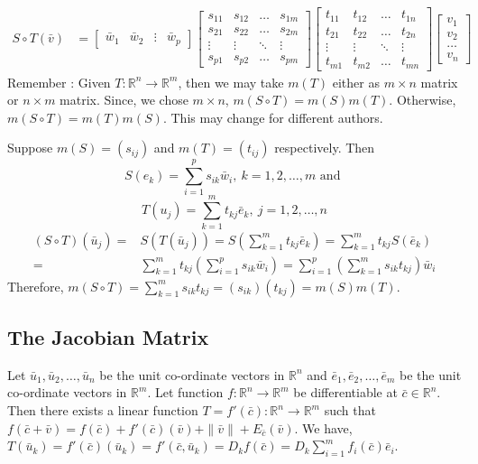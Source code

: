 \begin{commentary}
\begin{align*}
	S \circ T(\bar{v}) & = \begin{bmatrix} \bar{w}_1 & \bar{w}_2 & \vdots & \bar{w}_p \end{bmatrix} \begin{bmatrix} s_{11} & s_{12} & \dots & s_{1m} \\ s_{21} & s_{22} & \dots & s_{2m} \\ \vdots & \vdots & \ddots & \vdots \\ s_{p1} & s_{p2} & \dots & s_{pm} \end{bmatrix} \begin{bmatrix} t_{11} & t_{12} & \dots & t_{1n} \\ t_{21} & t_{22} & \dots & t_{2n} \\ \vdots & \vdots & \ddots & \vdots \\ t_{m1} & t_{m2} & \dots & t_{mn} \end{bmatrix} \begin{bmatrix} v_1 \\ v_2 \\ \dots \\ v_n  \end{bmatrix} 
\end{align*}
Remember : Given $T : \mathbb{R}^n \to \mathbb{R}^m$, then we may take $m(T)$ either as $m \times n$ matrix or $n \times m$ matrix.
Since, we chose $m \times n$, $m(S \circ T) = m(S)m(T)$.
Otherwise, $m(S \circ T) = m(T)m(S)$.
This may change for different authors.
\end{commentary}

Suppose $m(S) = (s_{ij})$ and $m(T) = (t_{ij})$ respectively.
Then
\[ S(e_k) = \sum_{i=1}^p s_{ik} \bar{w}_i,\ k=1,2,\dots,m \text{ and }\]
\[ T(u_j) = \sum_{k=1}^m t_{kj} \bar{e}_k,\ j=1,2,\dots,n \]
\begin{align*}
	(S \circ T)(\bar{u}_j) = & S(T(\bar{u}_j)) = S\left(\sum_{k=1}^m t_{kj}\bar{e}_k\right) = \sum_{k=1}^m t_{kj}S(\bar{e}_k) \\ 
	= & \sum_{k=1}^m t_{kj}\left( \sum_{i=1}^p s_{ik} \bar{w}_i\right) = \sum_{i=1}^p \left(\sum_{k=1}^m s_{ik}t_{kj}\right)\bar{w}_i
\end{align*}
Therefore, $m(S \circ T) = \sum_{k=1}^m s_{ik}t_{kj} = (s_{ik})(t_{kj}) =  m(S)m(T)$.

\subsection{The Jacobian Matrix}
Let $\bar{u}_1, \bar{u}_2, \dots, \bar{u}_n$ be the unit co-ordinate vectors in $\mathbb{R}^n$ and $\bar{e}_1, \bar{e}_2, \dots, \bar{e}_m$ be the unit co-ordinate vectors in $\mathbb{R}^m$.
Let function $f : \mathbb{R}^n \to \mathbb{R}^m$ be differentiable at $\bar{c} \in \mathbb{R}^n$.
Then there exists a linear function $T = f'(\bar{c}) : \mathbb{R}^n \to \mathbb{R}^m$ such that $f(\bar{c}+\bar{v}) = f(\bar{c})+f'(\bar{c})(\bar{v}) + \|\bar{v}\|+E_{\bar{c}}(\bar{v})$.
We have, $T(\bar{u}_k) = f'(\bar{c})(\bar{u}_k) = f'(\bar{c},\bar{u}_k) = D_kf(\bar{c}) = D_k \sum_{i=1}^m f_i(\bar{c})\bar{e}_i$.

